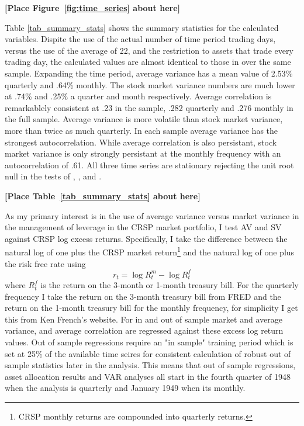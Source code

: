 \bigskip
\centerline{\bf [Place Figure~\ref{fig:time_series} about here]}
\bigskip
Table \ref{tab_summary_stats} shows the summary statistics for the calculated variables. Dispite the use of the actual number of time period trading days, versus the use of the average of 22, and the restriction to assets that trade every trading day, the calculated values are almost identical to those in \citet{pollet_average_2010} over the same sample. Expanding the time period, average variance has a mean value of 2.53\% quarterly and .64\% monthly. The stock market variance numbers are much lower at .74\% and .25\% a quarter and month respectively. Average correlation is remarkablely consistent at .23 in the \cite{pollet_average_2010} sample, .282 quarterly and .276 monthly in the full sample. Average variance is more volatile than stock market variance, more than twice as much quarterly. In each sample average variance has the strongest autocorrelation. While average correlation is also persistant, stock market variance is only strongly persistant at the monthly frequency with an autocorrelation of .61. All three time series are stationary rejecting the unit root null in the tests of \citet{dickey_distribution_1979}, \citet{Ng2001}, and \citet{ers1996}.\\
\bigskip
\centerline{\bf [Place Table~\ref{tab_summary_stats} about here]}
\bigskip

As my primary interest is in the use of average variance versus market variance in the management of leverage in the CRSP market portfolio, I test AV and SV against CRSP log excess returns. Specifically, I take the difference between the natural log of one plus the CRSP market return\footnote{CRSP monthly returns are compounded into quarterly returns.} and the natural log of one plus the risk free rate using
\begin{equation}
	r_{t} = \log R^{m}_{t} - \log R^{f}_{t} 
\end{equation}
where $R^{f}_{t}$ is the return on the 3-month or 1-month treasury bill.
For the quarterly frequency I take the return on the 3-month treasury bill from FRED and the return on the 1-month treasury bill for the monthly frequency, for simplicity I get this from Ken French's website. For in and out of sample market and average variance, and average correlation are regressed against these excess log return values. Out of sample regressions require an "in sample" training period which is set at 25\% of the available time seires for consistent calculation of robust out of sample statistics later in the analysis. This means that out of sample regressions, asset allocation results and VAR analyses all start in the fourth quarter of 1948 when the analysis is quarterly and January 1949 when its monthly.
